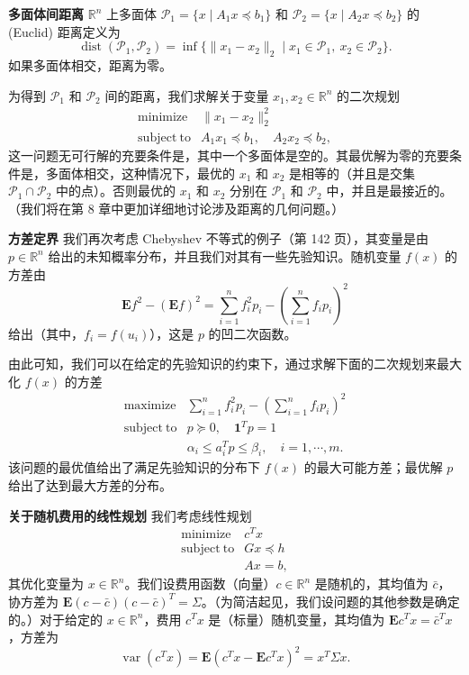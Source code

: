\documentclass[UTF8, 12pt, fontset=fandol, oneside]{ctexart}
\begin{document}
\noindent\textbf{多面体间距离}\quad
$\mathbb{R}^n$ 上多面体 $\mathcal{P}_1=\{x\mid A_1x\preceq b_1\}$ 和 $\mathcal{P}_2=\{x\mid A_2x\preceq b_2\}$ 的 (Euclid) 距离定义为
\[
\operatorname{dist}(\mathcal{P}_1,\mathcal{P}_2)=\inf\{\|x_1-x_2\|_2\mid x_1\in\mathcal{P}_1,\ x_2\in\mathcal{P}_2\}.
\]
如果多面体相交，距离为零。

为得到 $\mathcal{P}_1$ 和 $\mathcal{P}_2$ 间的距离，我们求解关于变量 $x_1,x_2\in\mathbb{R}^n$ 的二次规划
\[
\begin{array}{ll}
\mathop{\mathrm{minimize}} & \|x_1-x_2\|_2^2\\
\mathrm{subject\ to} & A_1x_1\preceq b_1,\quad A_2x_2\preceq b_2,
\end{array}
\]
这一问题无可行解的充要条件是，其中一个多面体是空的。其最优解为零的充要条件是，多面体相交，这种情况下，最优的 $x_1$ 和 $x_2$ 是相等的（并且是交集 $\mathcal{P}_1\cap\mathcal{P}_2$ 中的点）。否则最优的 $x_1$ 和 $x_2$ 分别在 $\mathcal{P}_1$ 和 $\mathcal{P}_2$ 中，并且是最接近的。（我们将在第 8 章中更加详细地讨论涉及距离的几何问题。）

\noindent\textbf{方差定界}\quad
我们再次考虑 Chebyshev 不等式的例子（第 142 页），其变量是由 $p\in\mathbb{R}^n$ 给出的未知概率分布，并且我们对其有一些先验知识。随机变量 $f(x)$ 的方差由
\[
\mathbf{E}f^2-(\mathbf{E}f)^2=\sum_{i=1}^n f_i^2p_i-\left(\sum_{i=1}^n f_ip_i\right)^2
\]
给出（其中，$f_i=f(u_i)$），这是 $p$ 的凹二次函数。

由此可知，我们可以在给定的先验知识的约束下，通过求解下面的二次规划来最大化 $f(x)$ 的方差
\[
\begin{array}{ll}
\mathop{\mathrm{maximize}} & \displaystyle\sum_{i=1}^n f_i^2p_i-\left(\sum_{i=1}^n f_ip_i\right)^2\\
\mathrm{subject\ to} & p\succeq 0,\quad \mathbf{1}^Tp=1\\
& \alpha_i\leq a_i^Tp\leq \beta_i,\quad i=1,\cdots,m.
\end{array}
\]
该问题的最优值给出了满足先验知识的分布下 $f(x)$ 的最大可能方差；最优解 $p$ 给出了达到最大方差的分布。

\noindent\textbf{关于随机费用的线性规划}\quad
我们考虑线性规划
\[
\begin{array}{ll}
\mathop{\mathrm{minimize}} & c^Tx\\
\mathrm{subject\ to} & Gx\preceq h\\
& Ax=b,
\end{array}
\]
其优化变量为 $x\in\mathbb{R}^n$。我们设费用函数（向量）$c\in\mathbb{R}^n$ 是随机的，其均值为 $\bar c$，协方差为 $\mathbf{E}(c-\bar c)(c-\bar c)^T=\Sigma$。（为简洁起见，我们设问题的其他参数是确定的。）对于给定的 $x\in\mathbb{R}^n$，费用 $c^Tx$ 是（标量）随机变量，其均值为 $\mathbf{E}c^Tx=\bar c^Tx$，方差为
\[
\operatorname{var}(c^Tx)=\mathbf{E}(c^Tx-\mathbf{E}c^Tx)^2=x^T\Sigma x.
\]
\end{document}
